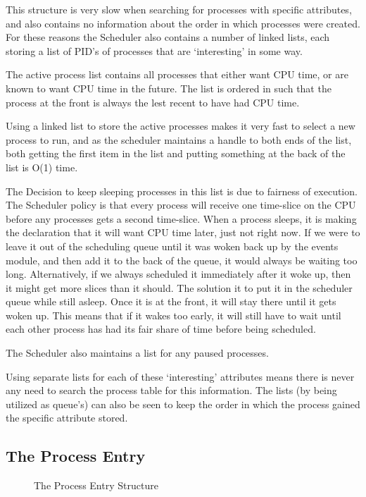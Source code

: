 \documentclass[a4paper]{report}
\begin{document}
This structure is very slow when searching for processes with specific attributes, and also contains no information about the order in which processes were created. For these reasons the Scheduler also contains a number of linked lists, each storing a list of PID's of processes that are `interesting' in some way.

The active process list contains all processes that either want CPU time, or are known to want CPU time in the future. The list is ordered in such that the process at the front is always the lest recent to have had CPU time.

Using a linked list to store the active processes makes it very fast to select a new process to run, and as the scheduler maintains a handle to both ends of the list, both getting the first item in the list and putting something at the back of the list is O(1) time.

The Decision to keep sleeping processes in this list is due to fairness of execution. The Scheduler policy is that every process will receive one time-slice on the CPU before any processes gets a second time-slice. When a process sleeps, it is making the declaration that it will want CPU time later, just not right now. If we were to leave it out of the scheduling queue until it was woken back up by the events module, and then add it to the back of the queue, it would always be waiting too long. Alternatively, if we always scheduled it immediately after it woke up, then it might get more slices than it should. The solution it to put it in the scheduler queue while still asleep. Once it is at the front, it will stay there until it gets woken up. This means that if it wakes too early, it will still have to wait until each other process has had its fair share of time before being scheduled.

The Scheduler also maintains a list for any paused processes.

Using separate lists for each of these `interesting' attributes means there is never any need to search the process table for this information. The lists (by being utilized as queue's) can also be seen to keep the order in which the process gained the specific attribute stored.

\subsection{The Process Entry}

\begin{figure}[ht]
  \centering

  \def\svgwidth{\columnwidth}
  \caption{The Process Entry Structure}
  \label{fig:schedulerscreen}
\end{figure}
\end{document}
